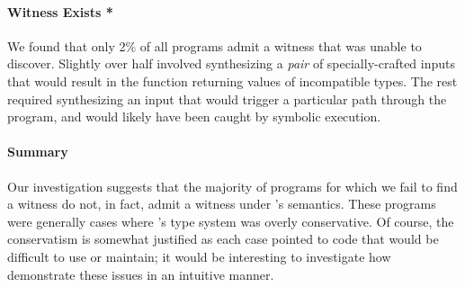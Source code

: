 
\paragraph{Witness Exists *}
%
We found that only 2\% of all programs admit a witness that \toolname
was unable to discover.
%
Slightly over half involved synthesizing a \emph{pair} of
specially-crafted inputs that would result in the function returning
values of incompatible types.
%
The rest required synthesizing an input that would trigger a
particular path through the program, and would likely have been caught
by symbolic execution.

\paragraph{Summary}
%
Our investigation suggests that the majority of programs
for which we fail to find a witness do not, in fact, admit a
witness under \toolname's semantics.
%
These programs were generally cases where \ocaml's type system was
overly conservative.
%
Of course, the conservatism is somewhat justified as each case pointed
to code that would be difficult to use or maintain;
%
it would be interesting to investigate how demonstrate these issues in an
intuitive manner.


